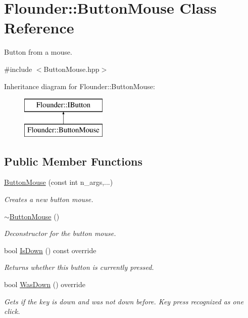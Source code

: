 \hypertarget{class_flounder_1_1_button_mouse}{}\section{Flounder\+:\+:Button\+Mouse Class Reference}
\label{class_flounder_1_1_button_mouse}


Button from a mouse.  




{\ttfamily \#include $<$Button\+Mouse.\+hpp$>$}

Inheritance diagram for Flounder\+:\+:Button\+Mouse\+:\begin{figure}[H]
\begin{center}
\leavevmode
\includegraphics[height=2.000000cm]{class_flounder_1_1_button_mouse}
\end{center}
\end{figure}
\subsection*{Public Member Functions}
\begin{DoxyCompactItemize}
\item 
\hyperlink{class_flounder_1_1_button_mouse_a88a82b1feb4c10ea48349ddb4eeb3f7b}{Button\+Mouse} (const int n\+\_\+args,...)
\begin{DoxyCompactList}\small\item\em Creates a new button mouse. \end{DoxyCompactList}\item 
\hyperlink{class_flounder_1_1_button_mouse_a0097f606ff098d235026d85d013cbb29}{$\sim$\+Button\+Mouse} ()
\begin{DoxyCompactList}\small\item\em Deconstructor for the button mouse. \end{DoxyCompactList}\item 
bool \hyperlink{class_flounder_1_1_button_mouse_aae2c553f4d3dabf948a5c6b6dd3b3c28}{Is\+Down} () const override
\begin{DoxyCompactList}\small\item\em Returns whether this button is currently pressed. \end{DoxyCompactList}\item 
bool \hyperlink{class_flounder_1_1_button_mouse_ae64500e920907de796d8e57a07c9fef0}{Was\+Down} () override
\begin{DoxyCompactList}\small\item\em Gets if the key is down and was not down before. Key press recognized as one click. \end{DoxyCompactList}\end{DoxyCompactItemize}
